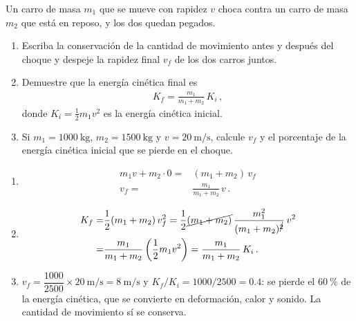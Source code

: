 \documentclass[12pt, a4paper]{article}
\begin{document}
\begin{exercise}[ID=choque, tags={banco}]
Un carro de masa $m_1$ que se mueve con rapidez $v$ choca contra un carro de masa $m_2$ que está en reposo, y los dos quedan pegados.
\begin{enumerate}
    \item Escriba la conservación de la cantidad de movimiento antes y después del choque y despeje la rapidez final $v_f$ de los dos carros juntos.
    \item Demuestre que la energía cinética final es
    \begin{align*}
        K_f = \frac{m_1}{m_1+m_2}\,K_i\,,
    \end{align*}
    donde $K_i=\frac{1}{2}m_1v^2$ es la energía cinética inicial.
    \item Si $m_1=\qty{1000}{\kilo\g}$, $m_2=\qty{1500}{\kilo\g}$ y $v=\qty{20}{\m/\s}$, calcule $v_f$ y el porcentaje de la energía cinética inicial que se pierde en el choque.
\end{enumerate}
\end{exercise}
\begin{solution}
\begin{enumerate}
    \item
    \begin{align}
        m_1 v + m_2\cdot 0 =& (m_1+m_2)\,v_f\nonumber\\
        v_f =& \frac{m_1}{m_1+m_2}\,v\,.
    \end{align}
    \item
    \begin{align}
        K_f =& \frac{1}{2}(m_1+m_2)\,v_f^2
        = \frac{1}{2}\cancel{(m_1+m_2)}\,\frac{m_1^2}{(m_1+m_2)^{\cancel{2}}}\,v^2\nonumber\\
        =& \frac{m_1}{m_1+m_2}\left(\frac{1}{2}m_1v^2\right)
        = \frac{m_1}{m_1+m_2}\,K_i\,.
    \end{align}
    \item $v_f = \dfrac{1000}{2500}\times\qty{20}{\m/\s} = \qty{8}{\m/\s}$ y $K_f/K_i = 1000/2500 = 0.4$: se pierde el $\qty{60}{\percent}$ de la energía cinética, que se convierte en deformación, calor y sonido. La cantidad de movimiento sí se conserva.
\end{enumerate}
\end{solution}
\end{document}
